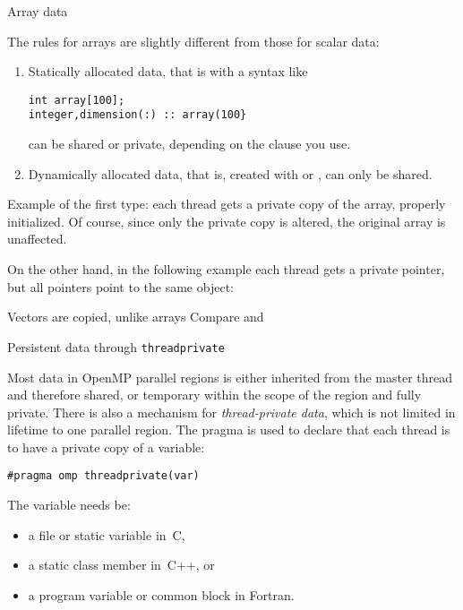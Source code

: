  {Array data}
\label{sec:omp-array}

The rules for arrays are slightly different from those for scalar data:
\begin{enumerate}
\item Statically allocated data, that is with a syntax like
\begin{lstlisting}
int array[100];
integer,dimension(:) :: array(100}
\end{lstlisting}
can be shared or private, depending on the clause you use.
\item Dynamically allocated data, that is, created with
   or
  , can only be shared.
\end{enumerate}
Example of the first type:
each thread gets a private copy of the array, properly initialized.
%
%
Of course, since only the private copy is altered, the original array
is unaffected.

On the other hand, in the following example
each thread gets a private pointer, but all pointers point to the same
object:
%

\begin{cppnote}{Vectors are copied, unlike arrays}
  Compare
  and
\end{cppnote}

 {Persistent data through \texttt{threadprivate}}
\label{sec:threadprivate}

Most data in OpenMP parallel regions is either inherited
from the master thread and therefore shared, or temporary within the scope of the
region and fully private.
There is also a mechanism for \emph{thread-private
  data},
which is not limited in lifetime to one parallel region.
The  pragma is used to declare that each thread
is to have a private copy of a variable:
\begin{lstlisting}
#pragma omp threadprivate(var)
\end{lstlisting}
The variable needs be:
\begin{itemize}
\item a file or static variable in~C,
\item a static class member in~C++, or
\item a program variable or common block in Fortran.
\end{itemize}

